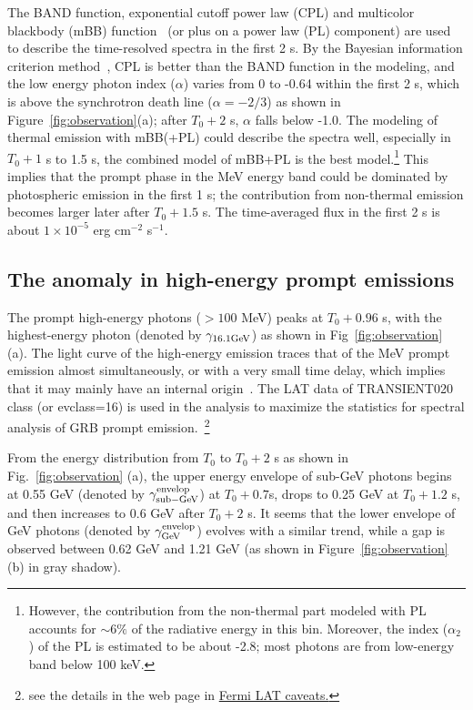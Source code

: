\documentclass[linenumbers,twocolumn]{aastex631}
\begin{document}
 The BAND function, exponential cutoff power law (CPL) and multicolor blackbody (mBB) function~\citep[e.g.][]{2008ApJ...682..463P,2010ApJ...709L.172R,2018ApJ...866...13H} (or plus on a power law (PL) component) are used to describe the time-resolved spectra in the first 2 s. By the Bayesian information criterion method~\citep[BIC,][]{2016MNRAS.463.1144W}, CPL is better than the BAND function in the modeling, and the low energy photon index ($\alpha$) varies from 0 to -0.64 within the first 2 s, which is above the synchrotron death line ($\alpha=-2/3$) as shown in Figure~\ref{fig:observation}(a); after $T_0 +2$ s, $\alpha$ falls below -1.0. The modeling of thermal emission with mBB(+PL) could describe the spectra well, especially in $T_0+1$ s to 1.5 s, the combined model of mBB+PL is the best model.\footnote{However, the contribution from the non-thermal part modeled with PL accounts for $\sim6\%$ of the radiative energy in this bin. Moreover, the index ($\alpha_2$) of the PL is estimated to be about -2.8; most photons are from low-energy band below 100 keV.} This implies that the prompt phase in the MeV energy band could be dominated by photospheric emission in the first 1 s; the contribution from non-thermal emission becomes larger later after $T_0+1.5$ s. The time-averaged flux in the first 2 s is about $1\times10^{-5}$ erg cm$^{-2}$ s$^{-1}$. %
 
 
\subsection{The anomaly in high-energy prompt emissions}
The prompt high-energy photons ($>100$ MeV) peaks at $T_0+0.96$ s, with the highest-energy photon (denoted by $\gamma_{16.1 \rm GeV}$) as shown in Fig~\ref{fig:observation} (a). The light curve of the high-energy emission traces that of the MeV prompt emission almost simultaneously, or with a very small time delay, which implies that it may mainly have an internal
origin~\citep{2011MNRAS.415...77M}. The LAT data of TRANSIENT020 class (or evclass=16) is used in the analysis to maximize the statistics for spectral analysis of GRB prompt emission.~\footnote{see the details in the web page in \href{https://fermi.gsfc.nasa.gov/ssc/data/analysis/LAT_caveats.HTML}{Fermi LAT caveats.}}

From the energy distribution from $T_0$ to $T_0 +2$ s as shown in Fig.~\ref{fig:observation} (a), the upper energy envelope of sub-GeV photons begins at 0.55 GeV (denoted by
$\gamma^{\rm envelop}_{\rm  sub-GeV}$) at $T_0+0.7$s, drops to 0.25 GeV at $T_0+1.2$ s, and then increases to 0.6 GeV after $T_0+2$ s. It seems that the lower envelope of GeV photons (denoted by $\gamma^{\rm envelop}_{\rm GeV}$) evolves with a similar trend, while  a gap is observed between 0.62 GeV and 1.21 GeV (as shown in Figure~\ref{fig:observation} (b) in gray shadow).
\end{document}
